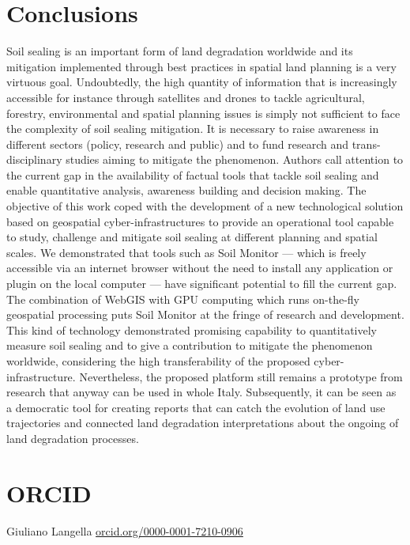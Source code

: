 \documentclass[APA,LATO1COL,doublespace]{WileyNJD-v2}
\newcommand\orcidicon[1]{\href{https://orcid.org/#1}{\mbox{\scalerel*{
\begin{tikzpicture}[yscale=-1,transform shape]
\pic{orcidlogo};
\end{tikzpicture}
}{|}}}}
\begin{document}
\section{Conclusions}
Soil sealing is an important form of land degradation worldwide and its mitigation implemented through best practices in spatial land planning is a very virtuous goal.
Undoubtedly, the high quantity of information that is increasingly accessible for instance through satellites and drones to tackle agricultural, forestry, environmental and spatial planning issues is simply not sufficient to face the complexity of soil sealing mitigation.
It is necessary to raise awareness in different sectors (policy, research and public) and to fund research and trans-disciplinary studies aiming to mitigate the phenomenon.
Authors call attention to the current gap in the availability of factual tools that tackle soil sealing and enable quantitative analysis, awareness building and decision making. 
The objective of this work coped with the development of a new technological solution based on geospatial cyber-infrastructures to provide an operational tool capable to study, challenge and mitigate soil sealing at different planning and spatial scales.
We demonstrated that tools such as Soil Monitor --- which is freely accessible via an internet browser without the need to install any application or plugin on the local computer --- have significant potential to fill the current gap.
The combination of WebGIS with GPU computing which runs on-the-fly geospatial processing puts Soil Monitor at the fringe of research and development. 
This kind of technology demonstrated promising capability to quantitatively measure soil sealing and to give a contribution to mitigate the %
phenomenon worldwide, considering the high transferability of the proposed cyber-infrastructure.
Nevertheless, the proposed platform still remains a prototype from research that anyway can be used in whole Italy. 
Subsequently, it can be seen as a democratic tool for creating reports that can catch the evolution of land use trajectories and connected land degradation interpretations about the ongoing of land degradation processes.

\section*{ORCID}
Giuliano Langella \href{https://orcid.org/0000-0001-7210-0906}{ {\orcidicon{0000-0001-7210-0906}}\hspace{1.0mm} orcid.org/0000-0001-7210-0906}


\end{document}
